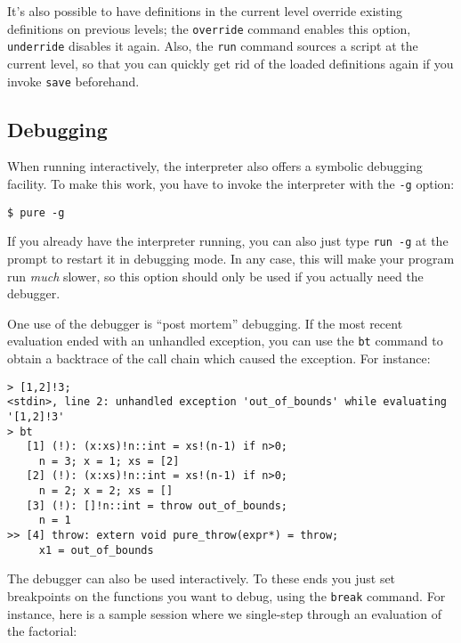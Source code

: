 \documentclass[a4paper,12pt]{article}
\begin{document}
It's also possible to have definitions in the current level override existing definitions on previous levels; the \verb|override| command enables this option, \verb|underride| disables it again. Also, the \verb|run| command sources a script at the current level, so that you can quickly get rid of the loaded definitions again if you invoke \verb|save| beforehand.

\subsection{Debugging}
\label{Debugging}

When running interactively, the interpreter also offers a symbolic debugging facility. To make this work, you have to invoke the interpreter with the \verb|-g| option:

\begin{verbatim}
$ pure -g
\end{verbatim}

If you already have the interpreter running, you can also just type \lstinline{run -g} at the prompt to restart it in debugging mode. In any case, this will make your program run \emph{much} slower, so this option should only be used if you actually need the debugger.

One use of the debugger is ``post mortem'' debugging. If the most recent evaluation ended with an unhandled exception, you can use the \verb|bt| command to obtain a backtrace of the call chain which caused the exception. For instance:

\begin{lstlisting}
> [1,2]!3;
<stdin>, line 2: unhandled exception 'out_of_bounds' while evaluating
'[1,2]!3'
> bt
   [1] (!): (x:xs)!n::int = xs!(n-1) if n>0;
     n = 3; x = 1; xs = [2]
   [2] (!): (x:xs)!n::int = xs!(n-1) if n>0;
     n = 2; x = 2; xs = []
   [3] (!): []!n::int = throw out_of_bounds;
     n = 1
>> [4] throw: extern void pure_throw(expr*) = throw;
     x1 = out_of_bounds
\end{lstlisting}

The debugger can also be used interactively. To these ends you just set breakpoints on the functions you want to debug, using the \verb|break| command. For instance, here is a sample session where we single-step through an evaluation of the factorial:
\end{document}
